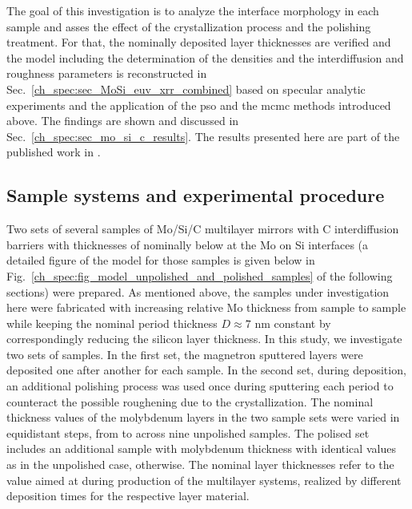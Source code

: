 The goal of this investigation is to analyze the interface morphology in each sample and asses the effect of the crystallization process and the polishing treatment. For that, the nominally deposited layer thicknesses are verified and the model including the determination of the densities and the interdiffusion and roughness parameters is reconstructed in Sec.~\ref{ch_spec:sec_MoSi_euv_xrr_combined} based on specular analytic experiments and the application of the \gls{pso} and the \gls{mcmc} methods introduced above. The findings are shown and discussed in Sec.~\ref{ch_spec:sec_mo_si_c_results}. The results presented here are part of the published work in .

\subsection{Sample systems and experimental procedure} \label{ch_spec:sec_mo_si_c_sample_systems_and_experimental}
Two sets of several samples of Mo/Si/C multilayer mirrors with C interdiffusion barriers with thicknesses of nominally below  at the Mo on Si interfaces (a detailed figure of the model for those samples is given below in Fig.~\ref{ch_spec:fig_model_unpolished_and_polished_samples} of the following sections) were prepared. As mentioned above, the samples under investigation here were fabricated with increasing relative Mo thickness from sample to sample while keeping the nominal period thickness $D\approx 7$ nm constant by correspondingly reducing the silicon layer thickness. In this study, we investigate two sets of samples. In the first set, the magnetron sputtered layers were deposited one after another for each sample. In the second set, during deposition, an additional polishing process was used once during sputtering each period to counteract the possible roughening due to the crystallization. The nominal thickness values of the molybdenum layers in the two sample sets were varied in equidistant steps, from  to  across nine unpolished samples. The polised set includes an additional sample with  molybdenum thickness with identical values as in the unpolished case, otherwise. The nominal layer thicknesses refer to the value aimed at during production of the multilayer systems, realized by different deposition times for the respective layer material.

